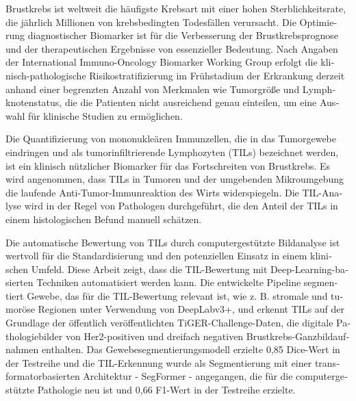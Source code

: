 \begin{otherlanguage}{ngerman} 
Brustkrebs ist weltweit die häufigste Krebsart mit einer hohen Sterblichkeitsrate, die jährlich Millionen von krebsbedingten Todesfällen verursacht.
Die Optimierung diagnostischer Biomarker ist für die Verbesserung der Brustkrebsprognose und der therapeutischen Ergebnisse von essenzieller Bedeutung.
Nach Angaben der International Immuno-Oncology Biomarker Working Group erfolgt die klinisch-pathologische Risikostratifizierung im Frühstadium der Erkrankung derzeit anhand einer begrenzten Anzahl von Merkmalen wie Tumorgröße und Lymphknotenstatus, die die Patienten nicht ausreichend genau einteilen, um eine Auswahl für klinische Studien zu ermöglichen. 

Die Quantifizierung von mononukleären Immunzellen, die in das Tumorgewebe eindringen und als tumorinfiltrierende Lymphozyten (TILs) bezeichnet werden, ist ein klinisch nützlicher Biomarker für das Fortschreiten von Brustkrebs.
Es wird angenommen, dass TILs in Tumoren und der umgebenden Mikroumgebung die laufende Anti-Tumor-Immunreaktion des Wirts widerspiegeln.
Die TIL-Analyse wird in der Regel von Pathologen durchgeführt, die den Anteil der TILs in einem histologischen Befund manuell schätzen.

Die automatische Bewertung von TILs durch computergestützte Bildanalyse ist wertvoll für die Standardisierung und den potenziellen Einsatz in einem klinischen Umfeld.
Diese Arbeit zeigt, dass die TIL-Bewertung mit Deep-Learning-basierten Techniken automatisiert werden kann. Die entwickelte Pipeline segmentiert Gewebe, das für die TIL-Bewertung relevant ist, wie z. B. stromale und tumoröse Regionen unter Verwendung von DeepLabv3+, und erkennt TILs auf der Grundlage der öffentlich veröffentlichten TiGER-Challenge-Daten, die digitale Pathologiebilder von Her2-positiven und dreifach negativen Brustkrebs-Ganzbildaufnahmen enthalten.
Das Gewebesegmentierungsmodell erzielte 0,85 Dice-Wert in der Testreihe und die TIL-Erkennung wurde als Segmentierung mit einer transformatorbasierten Architektur - SegFormer - angegangen, die für die computergestützte Pathologie neu ist und 0,66 F1-Wert in der Testreihe erzielte.


\end{otherlanguage}
